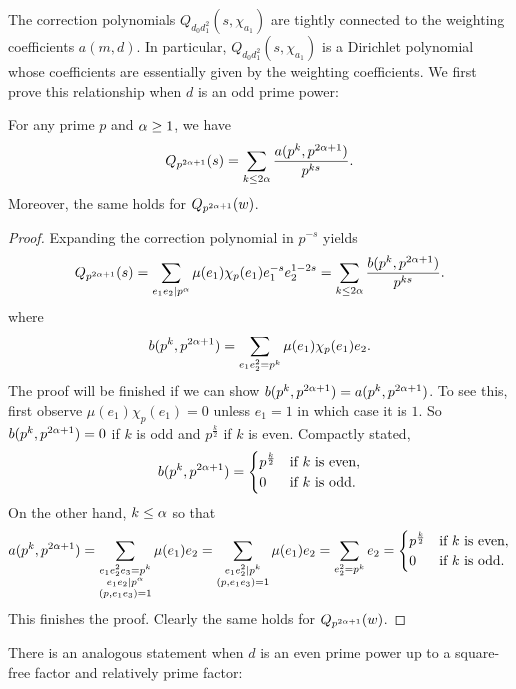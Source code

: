     The correction polynomials $Q_{d_{0}d_{1}^{2}}(s,\chi_{a_{1}})$ are tightly connected to the weighting coefficients $a(m,d)$. In particular, $Q_{d_{0}d_{1}^{2}}(s,\chi_{a_{1}})$ is a Dirichlet polynomial whose coefficients are essentially given by the weighting coefficients. We first prove this relationship when $d$ is an odd prime power:

    \begin{lemma}\label{NFlem:prime_correction_odd}
        For any prime $p$ and $\alpha \ge 1$, we have
        \[
            Q_{p^{2\alpha+1}}(s) = \sum_{k \le 2\alpha}\frac{a(p^{k},p^{2\alpha+1})}{p^{ks}}.
        \]
        Moreover, the same holds for $Q_{p^{2\alpha+1}}(w)$.
    \end{lemma}
    \begin{proof}
        Expanding the correction polynomial in $p^{-s}$ yields
        \[
            Q_{p^{2\alpha+1}}(s) = \sum_{e_{1}e_{2} \mid p^{\alpha}}\mu(e_{1})\chi_{p}(e_{1})e_{1}^{-s}e_{2}^{1-2s} = \sum_{k \le 2\alpha}\frac{b(p^{k},p^{2\alpha+1})}{p^{ks}}.
        \]
        where
        \[
            b(p^{k},p^{2\alpha+1}) = \sum_{e_{1}e_{2}^{2} = p^{k}}\mu(e_{1})\chi_{p}(e_{1})e_{2}.
        \]
        The proof will be finished if we can show $b(p^{k},p^{2\alpha+1}) = a(p^{k},p^{2\alpha+1})$. To see this, first observe $\mu(e_{1})\chi_{p}(e_{1}) = 0$ unless $e_{1} = 1$ in which case it is $1$. So $b(p^{k},p^{2\alpha+1}) = 0$ if $k$ is odd and $p^{\frac{k}{2}}$ if $k$ is even. Compactly stated,
        \[
            b(p^{k},p^{2\alpha+1}) = \begin{cases} p^{\frac{k}{2}} & \text{if $k$ is even}, \\ 0 & \text{if $k$ is odd}. \end{cases}
        \]
        On the other hand, $k \le \alpha$ so that
        \[
            a(p^{k},p^{2\alpha+1}) = \sum_{\substack{e_{1}e_{2}^{2}e_{3} = p^{k} \\ e_{1}e_{2} \mid p^{\alpha} \\ (p,e_{1}e_{3}) = 1}}\mu(e_{1})e_{2} = \sum_{\substack{e_{1}e_{2}^{2} \mid p^{k} \\ (p,e_{1}e_{3}) = 1}}\mu(e_{1})e_{2} = \sum_{e_{2}^{2} = p^{k}}e_{2} =  \begin{cases} p^{\frac{k}{2}} & \text{if $k$ is even}, \\ 0 & \text{if $k$ is odd}. \end{cases}
        \]
        This finishes the proof. Clearly the same holds for $Q_{p^{2\alpha+1}}(w)$.
    \end{proof}

    There is an analogous statement when $d$ is an even prime power up to a square-free factor and relatively prime factor:
    
